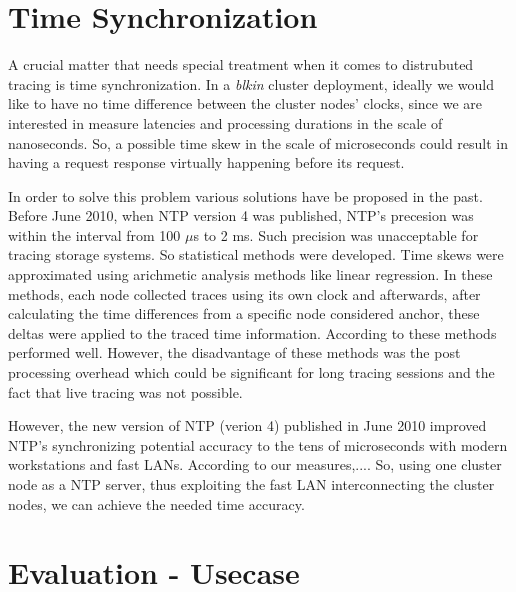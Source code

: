 \documentclass[a4paper,10pt,twocolumn]{article}
\begin{document}
%

\section{Time Synchronization}

A crucial matter that needs special treatment when it comes to distrubuted 
tracing is time synchronization. In a \emph{blkin} cluster deployment, ideally
we would like to have no time difference between the cluster nodes' clocks, 
since we are interested in measure latencies and processing durations in the 
scale of nanoseconds. So, a possible time skew in the scale of microseconds 
could result in having a request response virtually happening before its request.

In order to solve this problem various solutions have be proposed in the past.
Before June 2010, when NTP version 4 was published, NTP's precesion was within
the interval from 100 $\mu$s to 2 ms. Such precision was unacceptable for
tracing storage systems. So statistical methods were developed. Time skews were
approximated using arichmetic analysis methods like linear regression. In these
methods, each node collected traces using its own clock and afterwards, after
calculating the time differences from a specific node considered anchor, these
deltas were applied to the traced time information. According to \cite{hp} these
methods performed well. However, the disadvantage of these methods was the post
processing overhead which could be significant for long tracing sessions and the
fact that live tracing was not possible.

However, the new version of NTP (verion 4) published in June 2010 improved NTP's
synchronizing potential accuracy to the tens of microseconds with modern 
workstations and fast LANs. According to our measures,....
So, using one cluster node as a NTP server, thus exploiting the fast LAN 
interconnecting the cluster nodes, we can achieve the needed time accuracy.
 
\section{Evaluation - Usecase}
\end{document}
